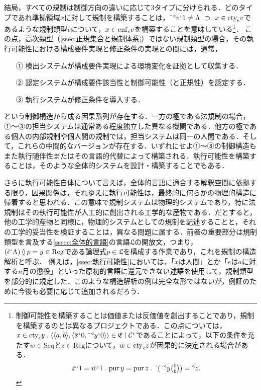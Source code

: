 結局，すべての規制は制御方向の違いに応じて3タイプに分けられる．どのタイプであれ準拠領域$x$に対して規制を構築することは，$ \tildel{\trgl{v}}\fap 1 \neq\Lambda \case{1}{1}{1}x\in\cty{\epsilon}v $であるような規制類型$v$について，$ x\in\mathrm{enf}_{\epsilon}v $を構築することを意味している\footnote{
    制御可能性を構築することは価値または反価値を創出することであり，規制を構築するのとは異なるプロジェクトである．この点については，
    $ x\in\cty{\epsilon}y \con{1} \orp{\orp{a,b},\orp{\tilde{x}\fap 0,\tildel{\trgl{y}}\fap 0}}\in \mathfrak{E}\uphl\mathcal{C}^\epsilon $であることによって，以下の条件を充たす$ w\in\mathrm{Seq} $と$ z\in\mathrm{Reg} $について，$ w\in \mathrm{cty}_{\epsilon}z $が因果的に決定される場合がある．
    \[
        \tilde{x}\fap 1 = \tilde{w}\fap 1\con{1}\mathrm{pur}\,y = \mathrm{pur}\,z\con{1}\tildel{(\tildel{\trgl{y}}\tbinom{0}{b})} = \trgl{z}.
    \]}．
この点，高次類型（\ref{ssec:正規集合と規制体系}）ではない規制類型の場合，その執行可能性における構成要件実現と修正条件の実現との間には，通常，
\begin{enumerate}
    \item[①] 検出システムが構成要件実現による環境変化を証拠として収集する．
    \item[②] 認定システムが構成要件該当性と制御可能性（と正規性）を認定する．
    \item[③] 執行システムが修正条件を導入する．
\end{enumerate}
という制御構造から成る因果系列が存在する．一方の極である法規制の場合，①〜③の担当システムは通常ある程度独立した異なる機関である．他方の極である個人の内部規制や個人間の規制では，担当システムは同一の人間である．そして，これらの中間的なバージョンが存在する．いずれにせよ①〜③の制御構造もまた執行随伴性またはその言語的代替によって構築される．執行可能性を構築することは，そのような全体的システムを設計・構築することでもある．

さらに執行可能性自体について言えば，全体的言語に適合する解釈空間に依拠する限り，因果関係は，それゆえに執行可能性は，最終的に何らかの物理的構造に帰着すると思われる．この意味で規制システムは物理的システムであり，特に法規制はその執行可能性が人工的に創出される工学的な産物である．だとすると，他の工学的産物と同様に，物理的システムとしての規制を記述することと，それの工学的妥当性を検証することは，異なる問題に属する．前者の重要部分は規制類型を言及する\ref{sssec:全体的言語}の言語$\mathfrak{L}$の開放文，つまり，$ (\breve{\epsilon}{\mspace{1mu}{`}\mspace{1mu}}\Lambda)\mathbin{\between} p = y\in\mathrm{Reg} $である論理式$p\in\mathfrak{L}$を構成する作業であり，これを規制の構造解析と呼ぶ．
例えば，\ref{ssec:執行可能性}においては，「$x$は人間」とか「$e$は$a$に対する$n$月の懲役」といった原初的言語に還元できない述語を使用して，規制類型を部分的に規定した．このような構造解析の例は完全な形ではないが，例証のために今後も必要に応じて追加されるだろう．

